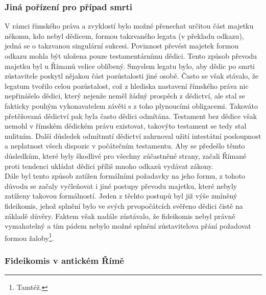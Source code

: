 \documentclass{article}
\begin{document}
\newpage

\subsubsection{Jiná pořízení pro případ smrti}

V rámci římského práva a zvyklostí bylo možné přenechat určitou část majetku někomu, kdo nebyl dědicem, formou takzvaného legata (v překladu odkazu), jedná se o takzvanou singulární sukcesi. Povinnost převést majetek formou odkazu mohla být uložena pouze testamentárnímu dědici. Tento způsob převodu majetku byl u Římanů velice oblíbený. Smyslem legatu bylo, aby dědic po smrti zůstavitele poskytl nějakou část pozůstalosti jiné osobě. Často se však stávalo, že legatum tvořilo celou pozůstalost, což z hlediska nastavení římského práva nic nepřinášelo dědici, který nejenže neměl žádný prospěch z dědictví, ale stal se fakticky pouhým vykonavatelem závěti s z toho plynoucími obligacemi. Takováto přetěžovaná dědictví pak byla často dědici odmítána. Testament bez dědice však nemohl v římském dědickém právu existovat, takovýto testament se tedy stal nulitním. Další důsledek odmítnutí dědictví zahrnoval užití intestátní posloupnost a neplatnost všech dispozic v počátečním testamentu. Aby se předešlo těmto důsledkům, které byly škodlivé pro všechny zúčastněné strany, začali Římané proti tendenci ukládat dědici příliš mnoho odkazů vydávat zákony.\\


Dále byl tento způsob zatížen formálními požadavky na jeho formu, z tohoto důvodu se začaly vyčleňovat i jiné postupy převodu majetku, které nebyly zatíženy takovou formálností. Jeden z těchto postupů byl již výše zmíněný fideikomis, jehož splnění bylo ve svých prvopočátcích svěřeno dědici čistě na základě důvěry. Faktem však nadále zůstávalo, že fideikomis nebyl právně vymahatelný a tím pádem nebylo možné splnění zůstavitelova přání požadovat formou žaloby\footnote{Tamtéž.}.\\


\subsubsection{Fideikomis v antickém Římě}
\end{document}

